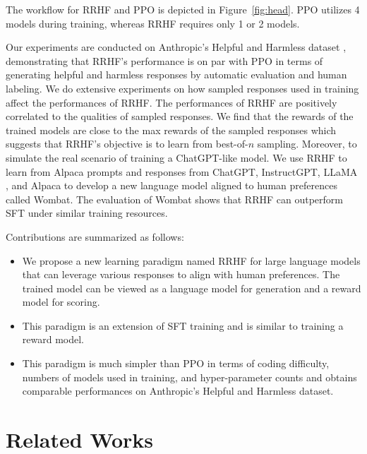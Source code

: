 The workflow for RRHF and PPO is depicted in Figure~\ref{fig:head}. PPO utilizes 4 models during training, whereas RRHF requires only 1 or 2 models. 

Our experiments are conducted on Anthropic's Helpful and Harmless dataset \cite{bai2022training}, demonstrating that RRHF's performance is on par with PPO in terms of generating helpful and harmless responses by automatic evaluation and human labeling. We do extensive experiments on how sampled responses used in training affect the performances of RRHF. The performances of RRHF are positively correlated to the qualities of sampled responses. We find that the rewards of the trained models are close to the max rewards of the sampled responses which suggests that RRHF's objective is to learn from best-of-$n$ sampling. Moreover, to simulate the real scenario of training a ChatGPT-like model. We use RRHF to learn from Alpaca prompts \cite{alpaca} and responses from ChatGPT, InstructGPT, LLaMA \cite{touvron2023llama}, and Alpaca to develop a new language model aligned to human preferences called Wombat. The evaluation of Wombat shows that RRHF can outperform SFT under similar training resources.

Contributions are summarized as follows:

\begin{itemize}
    \item We propose a new learning paradigm named RRHF for large language models that can leverage various responses to align with human preferences. The trained model can be viewed as a language model for generation and a reward model for scoring.
    \item This paradigm is an extension of SFT training and is similar to training a reward model.
    \item This paradigm is much simpler than PPO in terms of coding difficulty, numbers of models used in training, and hyper-parameter counts and obtains comparable performances on Anthropic's Helpful and Harmless dataset.
\end{itemize}

\section{Related Works} 


